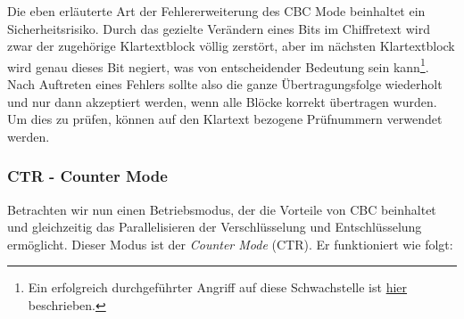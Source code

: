 Die eben erläuterte Art der Fehlererweiterung des CBC Mode beinhaltet ein Sicherheitsrisiko. Durch das gezielte Verändern eines Bits im Chiffretext wird zwar
der zugehörige Klartextblock völlig zerstört, aber im nächsten Klartextblock wird genau dieses Bit negiert, was von entscheidender Bedeutung sein kann\footnote{Ein erfolgreich durchgeführter Angriff auf diese Schwachstelle ist  \href{http://www.heise.de/security/artikel/Erfolgreicher-Angriff-auf-Linux-Verschluesselung-2072199.html}{hier} beschrieben.}. Nach
Auftreten eines Fehlers sollte also die ganze Übertragungsfolge wiederholt und nur dann akzeptiert werden, wenn alle Blöcke korrekt übertragen wurden. Um dies
zu prüfen, können auf den Klartext bezogene Prüfnummern verwendet werden.

\subsubsection{CTR - Counter Mode}

Betrachten wir nun einen Betriebsmodus, der die Vorteile von CBC beinhaltet und gleichzeitig das Parallelisieren der Verschlüsselung und Entschlüsselung ermöglicht. Dieser Modus ist der \textit{Counter Mode} (CTR). Er funktioniert wie folgt:

